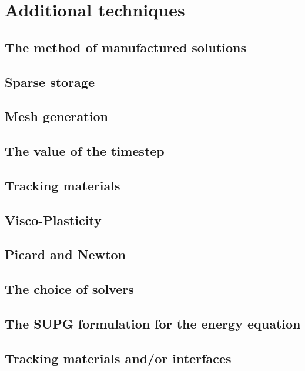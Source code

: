 \documentclass[a4paper]{article}
\begin{document}
\section{Additional techniques}

\subsection{The method of manufactured solutions}

\subsection{Sparse storage}

\subsection{Mesh generation}

\subsection{The value of the timestep}

\subsection{Tracking materials}

\subsection{Visco-Plasticity}

\subsection{Picard and Newton}

\subsection{The choice of solvers}

\subsection{The SUPG formulation for the energy equation}

\subsection{Tracking materials and/or interfaces}
\end{document}
